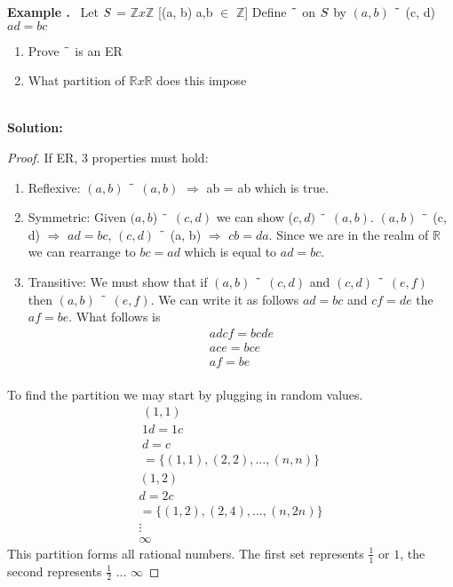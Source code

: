 \documentclass{article}
\newcounter{example}
\newcounter{solution}
\theoremstyle{claim}
\newcommand\Example{%
  \stepcounter{example}%
  \textbf{Example \theexample.}~%
  \setcounter{solution}{0}%
}
\newcommand\TheSolution{%
  \textbf{Solution:}\\%
}
\begin{document}
\Example Let  $\Huge S$ = $\mathbb{Z}x\mathbb{Z}$ [(a, b) a,b $\in$ $\mathbb{Z}$]
Define $\char`\~$ on  $\Huge S$ by $(a, b)$ $\char`\~$ (c, d) \iff $ad = bc$
\begin{enumerate}
  \item Prove $\char`\~$ is an ER
  \item What partition of $\mathbb{R}x\mathbb{R}$ does this impose
\end{enumerate}\\
\TheSolution 
\begin{proof}
If ER, 3 properties must hold:
\begin{enumerate}
  \item Reflexive: $(a, b)$ $\char`\~$ $(a, b)$ $\Longrightarrow$ ab = ab which is true.
  \item Symmetric: Given $(a, b$) $\char`\~$ $(c, d)$ we can show ($c, d)$ $\char`\~$ $(a, b)$. $(a, b)$ $\char`\~$ (c, d) $\Longrightarrow$ $ad = bc$, $(c, d)$ $\char`\~$ (a, b) $\Longrightarrow$ $cb = da$. Since we are in the realm of $\mathbb{R}$ we can rearrange to $bc = ad$ which is equal to $ad = bc$.
  \item Transitive: We must show that if $(a, b)$ $\char`\~$ $(c, d)$ and $(c, d)$ $\char`\~$ $(e, f)$ then $(a, b)$ $\char`\~$ $(e, f)$. We can write it as follows $ad = bc$ and $cf = de$  the $af = be$. What follows is
  \begin{gather*} 
  adcf = bcde   \\
  ace = bce     \\
  af = be       \\
  \end{gather*} 
\end{enumerate}
To find the partition we may start by plugging in random values.\\
\begin{gather*} 
(1, 1)  \\
1d = 1c \\
d = c   \\
= \{(1, 1), (2, 2), \dots, (n, n)\}
\end{gather*}
\begin{gather*} 
(1, 2)\\
d = 2c\\
= \{(1, 2), (2, 4), \dots, (n, 2n)\}\\
\vdots\\
\infty
\end{gather*} 
This partition forms all rational numbers. The first set represents $\frac{1}{1}$ or $1$, the second represents $\frac{1}{2}$ $\dots$ $\infty$
\end{proof}
\end{document}
